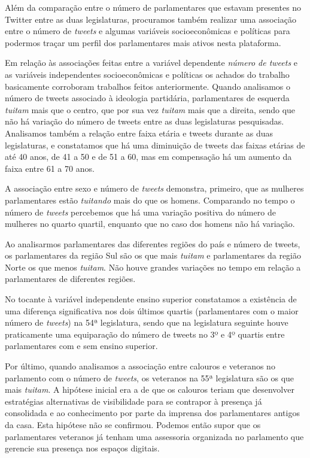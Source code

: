 Além da comparação entre o número de parlamentares que estavam presentes
no Twitter entre as duas legislaturas, procuramos também realizar uma
associação entre o número de \textit{tweets} e algumas variáveis
socioeconômicas e políticas para podermos traçar um perfil dos
parlamentares mais ativos nesta plataforma.

Em relação às associações feitas entre a variável dependente \textit{número de
tweets} e as variáveis independentes socioeconômicas e políticas os
achados do trabalho basicamente corroboram trabalhos feitos
anteriormente. Quando analisamos o número de tweets associado à
ideologia partidária, parlamentares de esquerda \textit{tuitam} mais que o
centro, que por sua vez \textit{tuitam} mais que a direita, sendo que não
há variação do número de tweets entre as duas legislaturas pesquisadas.
Analisamos também a relação entre faixa etária e tweets durante as duas
legislaturas, e constatamos que há uma diminuição de tweets das faixas
etárias de até 40 anos, de 41 a 50 e de 51 a 60, mas em compensação há
um aumento da faixa entre 61 a 70 anos.

A associação entre sexo e número de \textit{tweets} demonstra, primeiro,
que as mulheres parlamentares estão \textit{tuitando} mais do que os
homens. Comparando no tempo o número de \textit{tweets} percebemos que há
uma variação positiva do número de mulheres no quarto quartil, enquanto
que no caso dos homens não há variação.

Ao analisarmos parlamentares das diferentes regiões do país e número de
tweets, os parlamentares da região Sul são os que mais \textit{tuitam} e
parlamentares da região Norte os que menos \textit{tuitam}. Não houve
grandes variações no tempo em relação a parlamentares de diferentes
regiões.

No tocante à variável independente ensino superior constatamos a
existência de uma diferença significativa nos dois últimos quartis
(parlamentares com o maior número de \textit{tweets}) na 54ª legislatura,
sendo que na legislatura seguinte houve praticamente uma equiparação do
número de tweets no 3º e 4º quartis entre parlamentares com e sem ensino
superior.

Por último, quando analisamos a associação entre calouros e veteranos no
parlamento com o número de \textit{tweets}, os veteranos na 55ª
legislatura são os que mais \textit{tuitam}. A hipótese inicial era a de
que os calouros teriam que desenvolver estratégias alternativas de
visibilidade para se contrapor à presença já consolidada e ao
conhecimento por parte da imprensa dos parlamentares antigos da casa.
Esta hipótese não se confirmou. Podemos então supor que os parlamentares
veteranos já tenham uma assessoria organizada no parlamento que gerencie
sua presença nos espaços digitais.

